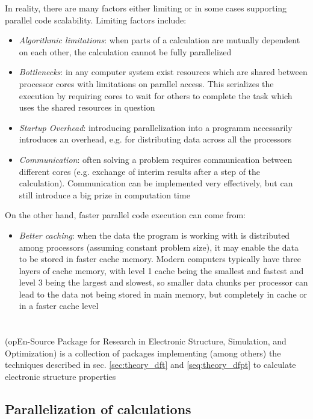 \documentclass[main.tex]{subfiles}
\begin{document}
In reality, there are many factors either limiting or in some cases supporting parallel code scalability. Limiting factors include:
\begin{itemize}
    \item \emph{Algorithmic limitations}: when parts of a calculation are mutually dependent on each other, the calculation cannot be fully parallelized
    \item \emph{Bottlenecks}: in any computer system exist resources which are shared between processor cores with limitations on parallel access. This serializes the execution by requiring cores to wait for others to complete the task which uses the shared resources in question
    \item \emph{Startup Overhead}: introducing parallelization into a programm necessarily introduces an overhead, e.g. for distributing data across all the processors
    \item \emph{Communication}: often solving a problem requires communication between different cores (e.g. exchange of interim results after a step of the calculation). Communication can be implemented very effectively, but can still introduce a big prize in computation time
\end{itemize}
On the other hand, faster parallel code execution can come from:
\begin{itemize}
    \item \emph{Better caching}: when the data the program is working with is distributed among processors (assuming constant problem size), it may enable the data to be stored in faster cache memory. Modern computers typically have three layers of cache memory, with level 1 cache being the smallest and fastest and level 3 being the largest and slowest, so smaller data chunks per processor can lead to the data not being stored in main memory, but completely in cache or in a faster cache level
\end{itemize}


\section{\QE}\label{sec:qe}

\QE (opEn-Source Package for Research in Electronic Structure, Simulation, and Optimization) \cite{giannozzi_quantum_2009,giannozzi_advanced_2017} is a collection of packages implementing (among others) the techniques described in sec. \ref{sec:theory_dft} and \ref{seq:theory_dfpt} to calculate electronic structure properties 


\subsection{Parallelization of \QE calculations}

\end{document}
